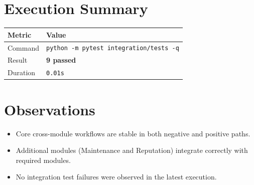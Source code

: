 \documentclass[11pt,a4paper]{article}
\begin{document}
\section{Execution Summary}
\begin{table}[h]
\centering
\begin{tabular}{ll}
\toprule
Metric & Value \\
\midrule
Command & \texttt{python -m pytest integration/tests -q} \\
Result & \textbf{9 passed} \\
Duration & \texttt{0.01s} \\
\bottomrule
\end{tabular}
\end{table}

\section{Observations}
\begin{itemize}
\item Core cross-module workflows are stable in both negative and positive paths.
\item Additional modules (Maintenance and Reputation) integrate correctly with required modules.
\item No integration test failures were observed in the latest execution.
\end{itemize}
\end{document}
